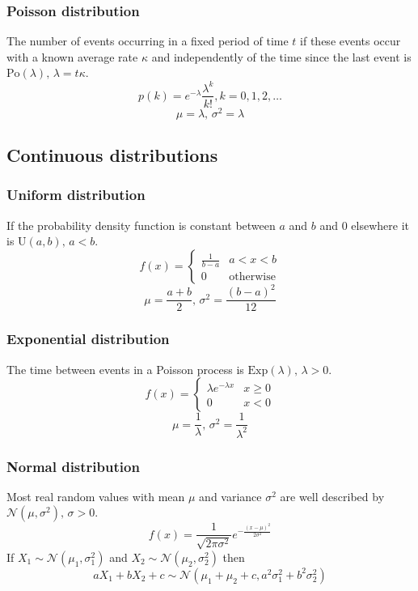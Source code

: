 \documentclass[
	a4paper,
	landscape,
	10pt,
]{article}
\begin{document}
\begin{multicols}{3}
\subsubsection*{Poisson distribution}
The number of events occurring in a fixed period of time $t$ if these events occur with a known average rate $\kappa$ and independently of the time since the last event is $\textrm{Po}(\lambda),\,\lambda=t\kappa$.
\[p(k)=e^{-\lambda}\frac{\lambda^k}{k!}, k=0,1,2,\dots\]
\[\mu=\lambda,\,\sigma^2=\lambda\]

\subsection{Continuous distributions}

\subsubsection*{Uniform distribution}
If the probability density function is constant between $a$ and $b$ and 0 elsewhere it is $\textrm{U}(a,b),\,a<b$.
\[f(x) = \left\{
\begin{array}{cl}
\frac{1}{b-a} & a<x<b\\
0 & \textrm{otherwise}
\end{array}\right.\]
\[\mu=\frac{a+b}{2},\,\sigma^2=\frac{(b-a)^2}{12}\]

\subsubsection*{Exponential distribution}
The time between events in a Poisson process is $\textrm{Exp}(\lambda),\,\lambda>0$.
\[f(x) = \left\{
\begin{array}{cl}
\lambda e^{-\lambda x} & x\geq0\\
0 & x<0
\end{array}\right.\]
\[\mu=\frac{1}{\lambda},\,\sigma^2=\frac{1}{\lambda^2}\]

\subsubsection*{Normal distribution}
Most real random values with mean $\mu$ and variance $\sigma^2$ are well described by $\mathcal{N}(\mu,\sigma^2),\,\sigma>0$.
\[ f(x) = \frac{1}{\sqrt{2\pi\sigma^2}}e^{-\frac{(x-\mu)^2}{2\sigma^2}} \]
If $X_1 \sim \mathcal{N}(\mu_1,\sigma_1^2)$ and $X_2 \sim \mathcal{N}(\mu_2,\sigma_2^2)$ then
\[ aX_1 + bX_2 + c \sim \mathcal{N}(\mu_1+\mu_2+c,a^2\sigma_1^2+b^2\sigma_2^2) \]

\end{multicols}
\end{document}
